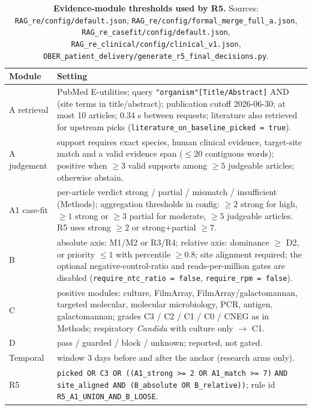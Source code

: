 \documentclass[11pt,a4paper]{article}
\newcommand{\filmarray}{FilmArray\xspace}
\newcommand{\rfive}{R5\xspace}
\begin{document}
\begin{table}[h]
\centering
\caption{\textbf{Evidence-module thresholds used by \rfive.} Sources: \texttt{RAG\_re/config/default.json}, \texttt{RAG\_re/config/formal\_merge\_full\_a.json}, \texttt{RAG\_re\_casefit/config/default.json}, \texttt{RAG\_re\_clinical/config/clinical\_v1.json}, \texttt{OBER\_patient\_delivery/generate\_r5\_final\_decisions.py}.}
\label{tab:s4}
\footnotesize
\begin{tabular}{p{2.0cm}p{13.0cm}}
\toprule
Module & Setting \\
\midrule
A retrieval & PubMed E-utilities; query \texttt{"organism"[Title/Abstract]} AND (site terms in title/abstract); publication cutoff 2026-06-30; at most 10 articles; 0.34 s between requests; literature also retrieved for upstream picks (\texttt{literature\_on\_baseline\_picked = true}). \\
A judgement & support requires exact species, human clinical evidence, target-site match and a valid evidence span ($\le 20$ contiguous words); positive when $\ge 3$ valid supports among $\ge 5$ judgeable articles; otherwise abstain. \\
A1 case-fit & per-article verdict strong / partial / mismatch / insufficient (Methods); aggregation thresholds in config: $\ge 2$ strong for high, $\ge 1$ strong or $\ge 3$ partial for moderate, $\ge 5$ judgeable articles. \rfive uses strong $\ge 2$ or strong$+$partial $\ge 7$. \\
B & absolute axis: M1/M2 or R3/R4; relative axis: dominance $\ge$ D2, or priority $\le 1$ with percentile $\ge 0.8$; site alignment required; the optional negative-control-ratio and reads-per-million gates are disabled (\texttt{require\_ntc\_ratio = false}, \texttt{require\_rpm = false}). \\
C & positive modules: culture, \filmarray, \filmarray/galactomannan, targeted molecular, molecular microbiology, PCR, antigen, galactomannan; grades C3 / C2 / C1 / C0 / CNEG as in Methods; respiratory \textit{Candida} with culture only $\rightarrow$ C1. \\
D & pass / guarded / block / unknown; reported, not gated. \\
Temporal & window 3 days before and after the anchor (research arms only). \\
\rfive & \texttt{picked OR C3 OR ((A1\_strong >= 2 OR A1\_match >= 7)} \texttt{AND site\_aligned AND (B\_absolute OR B\_relative))}; rule id \texttt{R5\_A1\_UNION\_AND\_B\_LOOSE}. \\
\bottomrule
\end{tabular}
\end{table}
\end{document}
